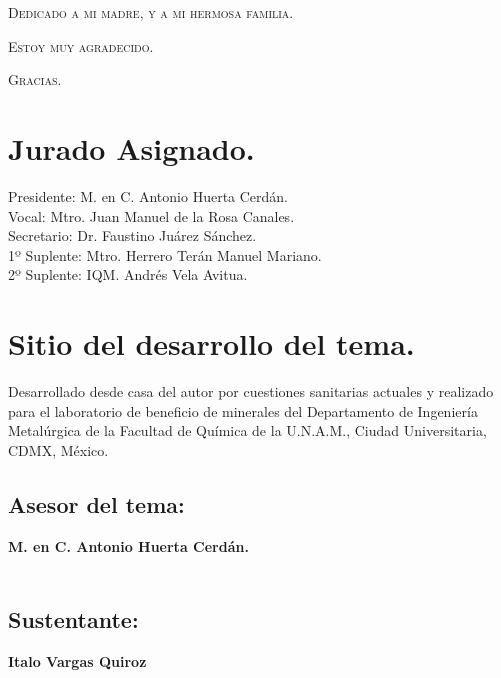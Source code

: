 \documentclass[11pt,letter
								]
								{article}
\begin{document}


\newpage
\thispagestyle{empty}
\textsc{Dedicado a mi madre, y a mi hermosa familia.}

\vspace{3.333cm}
\begin{flushright}
	\textsc{ Estoy muy agradecido. }

	\textsc{ Gracias. }
\end{flushright}
\newpage



\thispagestyle{empty}

\section*{Jurado Asignado.}


\large{ Presidente: M. en C. Antonio Huerta Cerdán.}\\

\large{Vocal: Mtro.  Juan Manuel de la Rosa Canales. }\\

\large{Secretario: Dr. Faustino Juárez Sánchez.}\\

\large{1º Suplente: Mtro. Herrero Terán Manuel Mariano. }\\

\large{2º Suplente: IQM. Andrés Vela Avitua.}\\


\vskip 1cm 

\section*{Sitio del desarrollo del tema.}

Desarrollado desde casa del autor por cuestiones sanitarias actuales  y realizado para el laboratorio de beneficio de minerales del Departamento de Ingeniería Metalúrgica de la Facultad de Química de la U.N.A.M., Ciudad Universitaria, CDMX, México.


\vskip 1cm 


\subsection*{Asesor del tema:}
\large{\bfseries  M. en C. Antonio Huerta Cerdán.}\\\\
\vskip 2cm 

\subsection*{Sustentante:}
\large{\bfseries  Italo Vargas Quiroz}\\\\
\end{document}
